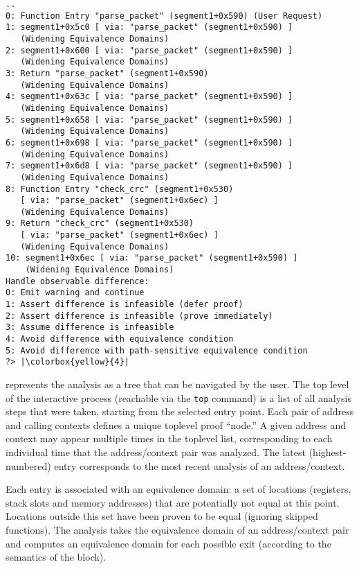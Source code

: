 \begin{lstlisting}
..
0: Function Entry "parse_packet" (segment1+0x590) (User Request)
1: segment1+0x5c0 [ via: "parse_packet" (segment1+0x590) ] 
   (Widening Equivalence Domains)
2: segment1+0x600 [ via: "parse_packet" (segment1+0x590) ] 
   (Widening Equivalence Domains)
3: Return "parse_packet" (segment1+0x590) 
   (Widening Equivalence Domains)
4: segment1+0x63c [ via: "parse_packet" (segment1+0x590) ] 
   (Widening Equivalence Domains)
5: segment1+0x658 [ via: "parse_packet" (segment1+0x590) ] 
   (Widening Equivalence Domains)
6: segment1+0x698 [ via: "parse_packet" (segment1+0x590) ] 
   (Widening Equivalence Domains)
7: segment1+0x6d8 [ via: "parse_packet" (segment1+0x590) ] 
   (Widening Equivalence Domains)
8: Function Entry "check_crc" (segment1+0x530) 
   [ via: "parse_packet" (segment1+0x6ec) ] 
   (Widening Equivalence Domains)
9: Return "check_crc" (segment1+0x530) 
   [ via: "parse_packet" (segment1+0x6ec) ] 
   (Widening Equivalence Domains)
10: segment1+0x6ec [ via: "parse_packet" (segment1+0x590) ] 
    (Widening Equivalence Domains)
Handle observable difference:
0: Emit warning and continue 
1: Assert difference is infeasible (defer proof) 
2: Assert difference is infeasible (prove immediately) 
3: Assume difference is infeasible 
4: Avoid difference with equivalence condition 
5: Avoid difference with path-sensitive equivalence condition
?> |\colorbox{yellow}{4}|
\end{lstlisting}

\pate{} represents the analysis as a tree that can be navigated by the user.
The top level of the interactive process (reachable via the \texttt{top} command) is a list of all analysis steps that were taken, starting from the selected entry point.
Each pair of address and calling contexts defines a unique toplevel proof ``node.''
A given address and context may appear multiple times in the toplevel list, corresponding to each individual time that the address/context pair was analyzed.
The latest (highest-numbered) entry corresponds to the most recent analysis of an address/context.

Each entry is associated with an equivalence domain: a set of locations (registers, stack slots and memory addresses) that are potentially not equal at this point.
Locations outside this set have been proven to be equal (ignoring skipped functions).
The analysis takes the equivalence domain of an address/context pair and computes an equivalence domain for each possible exit (according to the semantics of the block).

